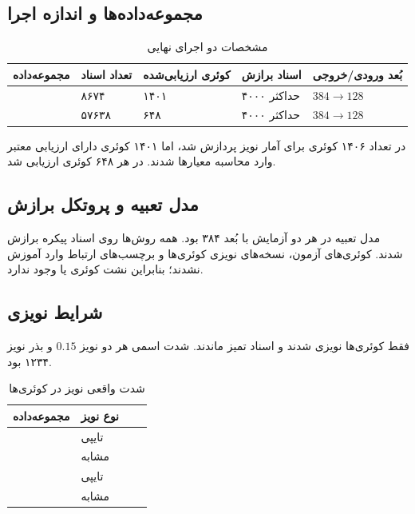 \documentclass[a4paper,12pt]{article}
\begin{document}
\subsection{مجموعه‌داده‌ها و اندازه اجرا}
\begin{table}[H]
\centering
\caption{مشخصات دو اجرای نهایی}
\label{tab:datasets}
\begin{tabular}{|C{3cm}|C{2.5cm}|C{2.6cm}|C{2.6cm}|C{2.6cm}|}
\hline
\textbf{مجموعه‌داده} & \textbf{تعداد اسناد} & \textbf{کوئری ارزیابی‌شده} & \textbf{اسناد برازش} & \textbf{بُعد ورودی/خروجی} \\
\hline
{} & ۸۶۷۴ & ۱۴۰۱ & حداکثر ۴۰۰۰ & $384\rightarrow128$ \\
\hline
{} & ۵۷۶۳۸ & ۶۴۸ & حداکثر ۴۰۰۰ & $384\rightarrow128$ \\
\hline
\end{tabular}
\end{table}

در  تعداد ۱۴۰۶ کوئری برای آمار نویز پردازش شد، اما ۱۴۰۱ کوئری دارای ارزیابی معتبر وارد محاسبه معیارها شدند. در  هر ۶۴۸ کوئری ارزیابی شد.

\subsection{مدل تعبیه و پروتکل برازش}
مدل تعبیه در هر دو آزمایش  با بُعد ۳۸۴ بود. همه روش‌ها روی اسناد پیکره برازش شدند. کوئری‌های آزمون، نسخه‌های نویزی کوئری‌ها و برچسب‌های ارتباط وارد آموزش نشدند؛ بنابراین نشت کوئری یا  وجود ندارد.

\subsection{شرایط نویزی}
فقط کوئری‌ها نویزی شدند و اسناد تمیز ماندند. شدت اسمی هر دو نویز $0.15$ و بذر نویز ۱۲۳۴ بود.
\begin{table}[H]
\centering
\caption{شدت واقعی نویز در کوئری‌ها}
\label{tab:noise-severity}
\begin{tabular}{|C{2.8cm}|C{2.8cm}|C{2.6cm}|C{2.6cm}|}
\hline
\textbf{مجموعه‌داده} & \textbf{نوع نویز} & \textbf{} & \textbf{} \\
\hline
{} & تایپی &  &  \\
\hline
{} & مشابه  &  &  \\
\hline
{} & تایپی &  &  \\
\hline
{} & مشابه  &  &  \\
\hline
\end{tabular}
\end{table}
\end{document}
